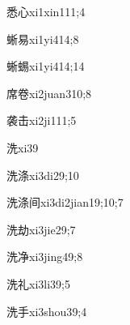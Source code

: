 \begin{verbete}{悉心}{xi1xin1}{11;4}
\end{verbete}

\begin{verbete}{蜥易}{xi1yi4}{14;8}
\end{verbete}

\begin{verbete}{蜥蜴}{xi1yi4}{14;14}
\end{verbete}

\begin{verbete}{席卷}{xi2juan3}{10;8}
\end{verbete}

\begin{verbete}{袭击}{xi2ji1}{11;5}
\end{verbete}

\begin{verbete}{洗}{xi3}{9}
\end{verbete}

\begin{verbete}{洗涤}{xi3di2}{9;10}
\end{verbete}

\begin{verbete}{洗涤间}{xi3di2jian1}{9;10;7}
\end{verbete}

\begin{verbete}{洗劫}{xi3jie2}{9;7}
\end{verbete}

\begin{verbete}{洗净}{xi3jing4}{9;8}
\end{verbete}

\begin{verbete}{洗礼}{xi3li3}{9;5}
\end{verbete}

\begin{verbete}{洗手}{xi3shou3}{9;4}
\end{verbete}


